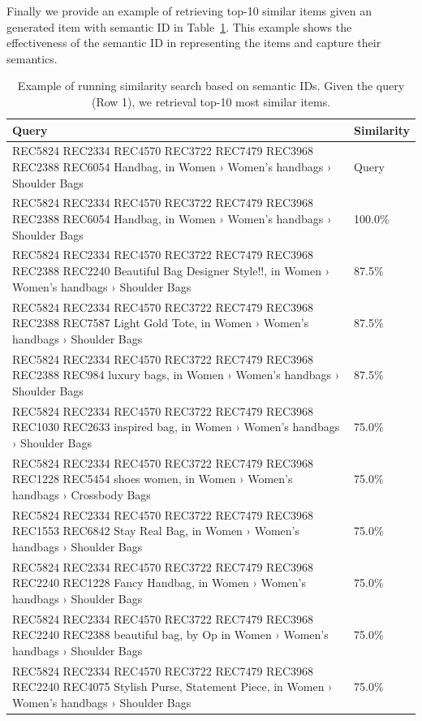 \documentclass[]{fairmeta}
\begin{document}
Finally we provide an example of retrieving top-10 similar items given an generated item with semantic ID in Table~\ref{tab:example_retrieval}. This example shows the effectiveness of the semantic ID in representing the items and capture their semantics.
\begin{table}[]
\caption{Example of running similarity search based on semantic IDs. Given the query (Row 1), we retrieval top-10 most similar items.}
\label{tab:example_retrieval}
\centering
\begin{tabular}{p{}|l}
\toprule
Query  & Similarity    \\
\midrule
\rowcolor{lightgray}
REC5824 REC2334 REC4570 REC3722 REC7479 REC3968 REC2388 REC6054 \newline Handbag, in Women › Women's handbags › Shoulder Bags & Query \\
\midrule
REC5824 REC2334 REC4570 REC3722 REC7479 REC3968 REC2388 REC6054 \newline Handbag, in Women › Women's handbags › Shoulder Bags & 100.0\% \\\hline
REC5824 REC2334 REC4570 REC3722 REC7479 REC3968 REC2388 REC2240 \newline Beautiful Bag Designer Style!!, in Women › Women's handbags › Shoulder Bags & 87.5\%\\\hline
REC5824 REC2334 REC4570 REC3722 REC7479 REC3968 REC2388 REC7587 \newline Light Gold Tote, in Women › Women's handbags › Shoulder Bags & 87.5\% \\\hline
REC5824 REC2334 REC4570 REC3722 REC7479 REC3968 REC2388 REC984 \newline luxury bags, in Women › Women's handbags › Shoulder Bags & 87.5\% \\\hline
REC5824 REC2334 REC4570 REC3722 REC7479 REC3968 REC1030 REC2633 \newline inspired bag, in Women › Women's handbags › Shoulder Bags & 75.0\% \\\hline
REC5824 REC2334 REC4570 REC3722 REC7479 REC3968 REC1228 REC5454 \newline shoes women, in Women › Women's handbags › Crossbody Bags & 75.0\% \\\hline
REC5824 REC2334 REC4570 REC3722 REC7479 REC3968 REC1553 REC6842 \newline Stay Real Bag, in Women › Women's handbags › Shoulder Bags & 75.0\% \\\hline
REC5824 REC2334 REC4570 REC3722 REC7479 REC3968 REC2240 REC1228 \newline Fancy Handbag, in Women › Women's handbags › Shoulder Bags & 75.0\% \\\hline
REC5824 REC2334 REC4570 REC3722 REC7479 REC3968 REC2240 REC2388 \newline beautiful bag, by Op in Women › Women's handbags › Shoulder Bags &  75.0\% \\\hline
REC5824 REC2334 REC4570 REC3722 REC7479 REC3968 REC2240 REC4075 \newline Stylish Purse, Statement Piece, in Women › Women's handbags › Shoulder Bags & 75.0\% \\
\bottomrule
\end{tabular}
\end{table}
\end{document}
